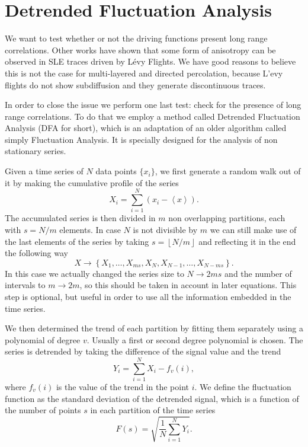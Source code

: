 \section{Detrended Fluctuation Analysis}
\label{sec:dfa}

We want to test whether or not the driving functions present long range
correlations. Other works have shown that some form of anisotropy can be
observed in SLE traces driven by L\'evy Flights. We have good reasons to
believe this is not the case for multi-layered and directed percolation,
because L'evy flights do not show subdiffusion and they generate discontinuous
traces.

In order to close the issue we perform one last test: check for the presence of
long range correlations. To do that we employ a method called Detrended
Fluctuation Analysis (DFA for short), which is an adaptation of an older
algorithm called simply Fluctuation Analysis. It is specially designed for the
analysis of non stationary series.%

Given a time series of $N$ data points $\{x_i\}$, we first generate a random walk
out of it by making the cumulative profile of the series
\begin{equation}
    X_i = \sum_{i=1}^{N} \left({x_i - \left\langle x \right\rangle}\right).
\end{equation}
The accumulated series is then divided in $m$ non overlapping partitions, each with
$s = N/m$ elements. In case $N$ is not divisible by $m$ we can still make use
of the last elements of the series by taking $s=\left\lfloor N/m\right\rfloor$
and reflecting it in the end the following way
\begin{equation}
    X\rightarrow\left\{X_1, \ldots, X_{ms},
                       X_{N}, X_{N - 1}, \ldots,
                       X_{N - ms}\right\}.
\end{equation}
In this case we actually changed the series size to $N\rightarrow2ms$ and the
number of intervals to $m\rightarrow2m$, so this should be taken in account in
later equations. This step is optional, but useful in order to use all the
information embedded in the time series.

We then determined the trend of each partition by fitting them separately using
a polynomial of degree $v$. Usually a first or second degree polynomial is
chosen. The series is detrended by taking the difference of the signal value and
the trend 
\begin{equation}
    Y_i = \sum_{i=1}^{N} X_i - f_v(i),
\end{equation}
where $f_v(i)$ is the value of the trend in the point $i$. We define the fluctuation
function as the standard deviation of the detrended signal, which is a function
of the number of points $s$ in each partition of the time series
\begin{equation}
    F(s) = \sqrt{\frac{1}{N}\sum_{i=1}^{N}Y_i}.
\end{equation}

